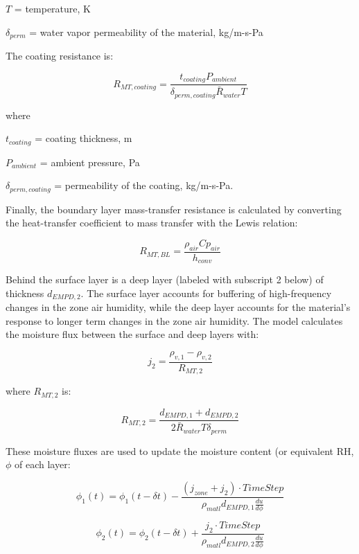 \(T\) = temperature, K

\(\delta_{perm}\) = water vapor permeability of the material, kg/m-s-Pa

The coating resistance is:

\begin{equation}
R_{MT,coating} = \frac {t_{coating} P_{ambient}} {\delta_{perm,coating} \bar R_{water} T}
\end{equation}

where

\(t_{coating}\) = coating thickness, m

\(P_{ambient}\) = ambient pressure, Pa

\(\delta_{perm,coating}\) = permeability of the coating, kg/m-s-Pa.

Finally, the boundary layer mass-transfer resistance is calculated by converting the heat-transfer coefficient to mass transfer with the Lewis relation:

\begin{equation}
R_{MT,BL} = \frac{\rho_{air} Cp_{air}}{h_{conv}}
\end{equation}

Behind the surface layer is a deep layer (labeled with subscript 2 below) of thickness \(d_{EMPD,2}\). The surface layer accounts for buffering of high-frequency changes in the zone air humidity, while the deep layer accounts for the material's response to longer term changes in the zone air humidity. The model calculates the moisture flux between the surface and deep layers with:

\begin{equation}
j_{2} = \frac {\rho_{v,1} - \rho_{v,2}} {R_{MT,2}}
\end{equation}

where \(R_{MT,2}\) is:

\begin{equation}
R_{MT,2} = \frac {d_{EMPD,1} + d_{EMPD,2}} {2 \bar R_{water} T \delta_{perm} }
\end{equation}

These moisture fluxes are used to update the moisture content (or equivalent RH, \(\phi\) of each layer:

\begin{equation}
\phi_{1}(t) = \phi_{1}(t-\delta t) - \frac { (j_{zone} + j_{2}) \cdot TimeStep} {\rho_{matl} d_{EMPD,1} \frac {du}{d\phi}}
\end{equation}

\begin{equation}
\phi_{2}(t) = \phi_{2}(t-\delta t) + \frac { j_{2} \cdot TimeStep} {\rho_{matl} d_{EMPD,2} \frac {du}{d\phi}}
\end{equation}

